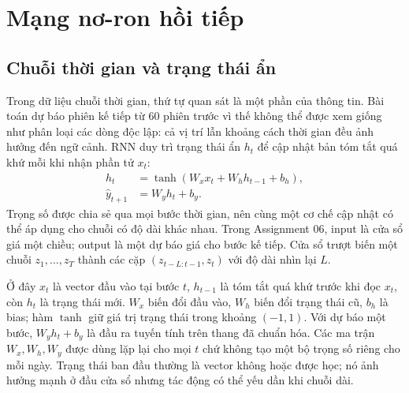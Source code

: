 \documentclass[12pt,a4paper]{report}
\begin{document}
\chapter{Mạng nơ-ron hồi tiếp}\label{ch:rnn}
\section{Chuỗi thời gian và trạng thái ẩn}
Trong dữ liệu chuỗi thời gian, thứ tự quan sát là một phần của thông tin. Bài toán dự báo phiên kế tiếp từ 60 phiên trước vì thế không thể được xem giống như phân loại các dòng độc lập: cả vị trí lẫn khoảng cách thời gian đều ảnh hưởng đến ngữ cảnh. RNN duy trì trạng thái ẩn $h_t$ để cập nhật bản tóm tắt quá khứ mỗi khi nhận phần tử $x_t$:
\begin{align}h_t&=\tanh(W_xx_t+W_hh_{t-1}+b_h),\\\hat y_{t+1}&=W_yh_t+b_y.\end{align}
Trọng số được chia sẻ qua mọi bước thời gian, nên cùng một cơ chế cập nhật có thể áp dụng cho chuỗi có độ dài khác nhau. Trong Assignment 06, input là cửa sổ giá một chiều; output là một dự báo giá cho bước kế tiếp. Cửa sổ trượt biến một chuỗi $z_1,\ldots,z_T$ thành các cặp $(z_{t-L:t-1},z_t)$ với độ dài nhìn lại $L$.

Ở đây $x_t$ là vector đầu vào tại bước $t$, $h_{t-1}$ là tóm tắt quá khứ trước khi đọc $x_t$, còn $h_t$ là trạng thái mới. $W_x$ biến đổi đầu vào, $W_h$ biến đổi trạng thái cũ, $b_h$ là bias; hàm $\tanh$ giữ giá trị trạng thái trong khoảng $(-1,1)$. Với dự báo một bước, $W_yh_t+b_y$ là đầu ra tuyến tính trên thang đã chuẩn hóa. Các ma trận $W_x,W_h,W_y$ được dùng lặp lại cho mọi $t$ chứ không tạo một bộ trọng số riêng cho mỗi ngày. Trạng thái ban đầu thường là vector không hoặc được học; nó ảnh hưởng mạnh ở đầu cửa sổ nhưng tác động có thể yếu dần khi chuỗi dài.
\end{document}
